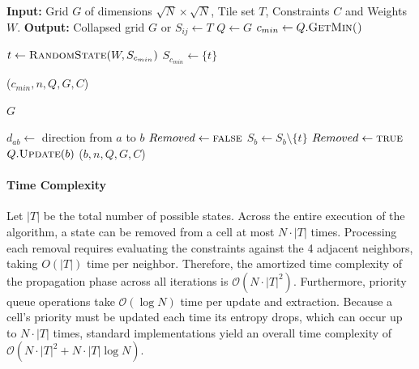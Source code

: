 \begin{algorithm}[H]
\caption{Sequential Wave Function Collapse}
\begin{algorithmic}[1]
\State \textbf{Input:} Grid $G$ of dimensions $\sqrt{N} \times \sqrt{N}$, Tile set $T$, Constraints $C$ and Weights $W$.
\State \textbf{Output:} Collapsed grid $G$ or 
    \State $S_{ij} \gets T$
\EndFor
\State $Q \gets G$ 
    \State $c_{min} \gets Q.\textproc{GetMin()}$ 
        \State \Return {} 
    \EndIf
    
    \State $t \gets \textproc{RandomState}(W,S_{c_{min}})$
    \State $S_{c_{min}} \gets \{t\}$ 

        \State {}($c_{min}, n, Q, G, C$)
    \EndFor 
\EndWhile

\State \Return $G$

\vspace{1em}

    \State $d_{ab} \gets$ direction from $a$ to $b$
    \State $Removed \gets \textproc{false}$
            \State $S_b \gets S_b \setminus \{t\}$
            \State $Removed \gets \textproc{true}$
        \EndIf
    \EndFor
     
        \State $Q.\textproc{Update}(b)$ 
            \State {}($b, n, Q, G, C$)
        \EndFor 
    \EndIf
\EndFunction

\end{algorithmic}
\end{algorithm}

\paragraph{Time Complexity} 

Let $|T|$ be the total number of possible states. Across the entire execution of the algorithm, a state can be removed from a cell at most $N \cdot |T|$ times. Processing each removal requires evaluating the constraints against the 4 adjacent neighbors, taking $O(|T|)$ time per neighbor. Therefore, the amortized time complexity of the propagation phase across all iterations is $\mathcal O(N \cdot |T|^2)$. Furthermore, priority queue operations take $\mathcal O(\log N)$ time per update and extraction. Because a cell's priority must be updated each time its entropy drops, which can occur up to $N \cdot |T|$ times, standard implementations yield an overall time complexity of $\mathcal O(N \cdot |T|^2 + N \cdot |T| \log N)$.
    
